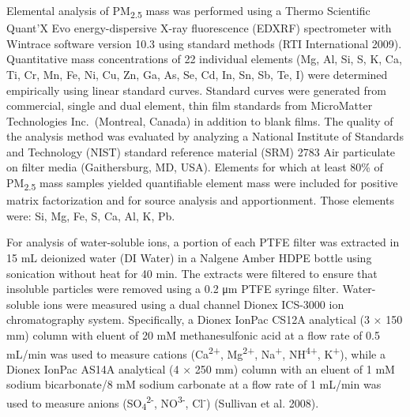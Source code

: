 \documentclass[
  letterpaper,
  DIV=11,
  numbers=noendperiod]{scrartcl}
\begin{document}
Elemental analysis of PM\textsubscript{2.5} mass was performed using a
Thermo Scientific Quant'X Evo energy-dispersive X-ray fluorescence
(EDXRF) spectrometer with Wintrace software version 10.3 using standard
methods (RTI International 2009). Quantitative mass concentrations of 22
individual elements (Mg, Al, Si, S, K, Ca, Ti, Cr, Mn, Fe, Ni, Cu, Zn,
Ga, As, Se, Cd, In, Sn, Sb, Te, I) were determined empirically using
linear standard curves. Standard curves were generated from commercial,
single and dual element, thin film standards from MicroMatter
Technologies Inc.~(Montreal, Canada) in addition to blank films. The
quality of the analysis method was evaluated by analyzing a National
Institute of Standards and Technology (NIST) standard reference material
(SRM) 2783 Air particulate on filter media (Gaithersburg, MD, USA).
Elements for which at least 80\% of PM\textsubscript{2.5} mass samples
yielded quantifiable element mass were included for positive matrix
factorization and for source analysis and apportionment. Those elements
were: Si, Mg, Fe, S, Ca, Al, K, Pb.

For analysis of water-soluble ions, a portion of each PTFE filter was
extracted in 15 mL deionized water (DI Water) in a Nalgene Amber HDPE
bottle using sonication without heat for 40 min. The extracts were
filtered to ensure that insoluble particles were removed using a 0.2 μm
PTFE syringe filter. Water-soluble ions were measured using a dual
channel Dionex ICS-3000 ion chromatography system. Specifically, a
Dionex IonPac CS12A analytical (3 × 150 mm) column with eluent of 20 mM
methanesulfonic acid at a flow rate of 0.5 mL/min was used to measure
cations (Ca\textsuperscript{2+}, Mg\textsuperscript{2+},
Na\textsuperscript{+}, NH\textsuperscript{4+}, K\textsuperscript{+}),
while a Dionex IonPac AS14A analytical (4 × 250 mm) column with an
eluent of 1 mM sodium bicarbonate/8 mM sodium carbonate at a flow rate
of 1 mL/min was used to measure anions
(SO\textsubscript{4}\textsuperscript{2-}, NO\textsuperscript{3-},
Cl\textsuperscript{-}) (Sullivan et al. 2008).
\end{document}
